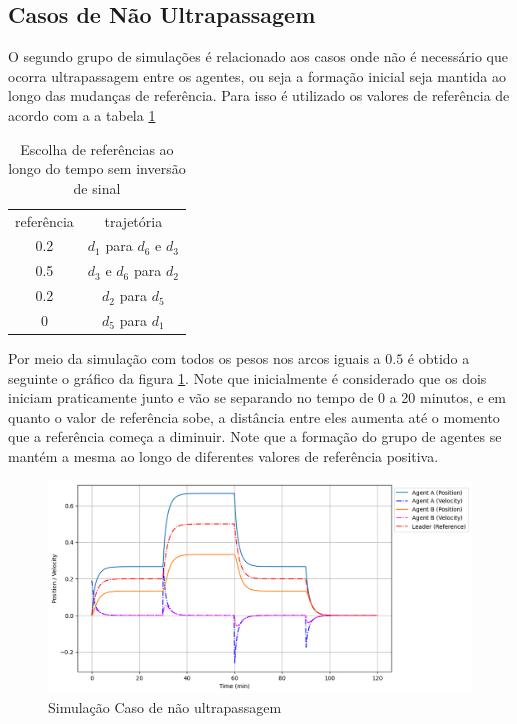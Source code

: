 \subsection{Casos de Não Ultrapassagem}
O segundo grupo de simulações é relacionado aos casos onde não é necessário que ocorra ultrapassagem entre os agentes, ou seja a formação inicial seja mantida ao longo das mudanças de referência. Para isso é utilizado os valores de referência de acordo com a a tabela \ref{tab:caso1_sem_utrapassagem}
\begin{table}[ht]
    \centering
    \begin{tabular}{c|c}                 
         referência & trajetória  \\ \cline{1-2}
         0.2 & $d_1$ para $d_6$ e $d_3$  \\ \cline{1-2}
         0.5 & $d_3$ e $d_6$ para $d_2$ \\ \cline{1-2}
         0.2 & $d_2$ para $d_5$  \\ \cline{1-2}
            0 & $d_5$ para $d_1$ \\     
    \end{tabular}
    \caption{Escolha de referências ao longo do tempo sem inversão de sinal}
    \label{tab:caso1_sem_utrapassagem}
\end{table}

Por meio da simulação com todos os pesos nos arcos iguais a $0.5$ é obtido a seguinte o gráfico da figura \ref{fig:case4}. Note que inicialmente é considerado que os dois iniciam praticamente junto e vão se separando no tempo de 0 a 20 minutos, e em quanto o valor de referência sobe, a distância entre eles aumenta até o momento que a referência começa a diminuir. Note que a formação do grupo de agentes se mantém a mesma ao longo de diferentes valores de referência positiva.

\begin{figure}[ht]
    \centering
    \caption{Simulação Caso de não ultrapassagem}
    \label{fig:case4}
    \includegraphics[width=1\linewidth]{figures/Simulation/Cooperativo/case4_fg2.png}
\end{figure}

